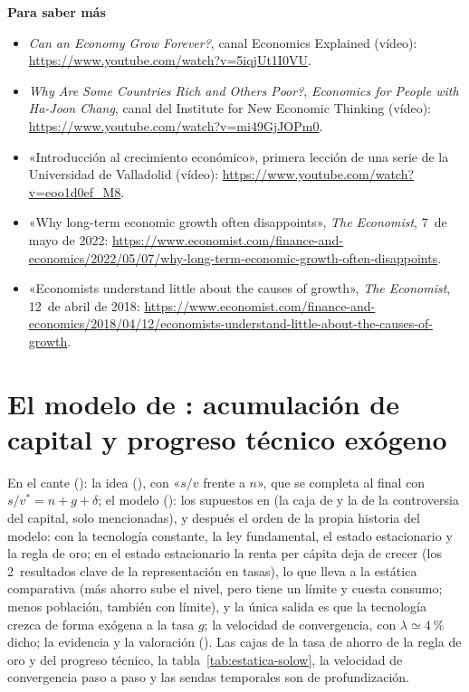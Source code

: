 \documentclass[11pt]{article}
\begin{document}
\begin{anotaciones}
\textbf{Para saber más}
\begin{itemize}
\item \emph{Can an Economy Grow Forever?}, canal Economics Explained (vídeo): \url{https://www.youtube.com/watch?v=5iqjUt1I0VU}\nocite{EconomicsExplained}.
\item \emph{Why Are Some Countries Rich and Others Poor?}, \emph{Economics for People with Ha-Joon Chang}, canal del Institute for New Economic Thinking (vídeo): \url{https://www.youtube.com/watch?v=mi49GjJOPm0}\nocite{INETChang}.
\item «Introducción al crecimiento económico», primera lección de una serie de la Universidad de Valladolid (vídeo): \url{https://www.youtube.com/watch?v=eoo1d0ef_M8}\nocite{UVaCrecimiento}.
\item «Why long-term economic growth often disappoints», \emph{The Economist}, 7~de mayo de 2022: \url{https://www.economist.com/finance-and-economics/2022/05/07/why-long-term-economic-growth-often-disappoints}\nocite{Economist2022Crecimiento}.
\item «Economists understand little about the causes of growth», \emph{The Economist}, 12~de abril de 2018: \url{https://www.economist.com/finance-and-economics/2018/04/12/economists-understand-little-about-the-causes-of-growth}\nocite{Economist2018Crecimiento}.
\end{itemize}
\end{anotaciones}

\section{El modelo de : acumulación de capital\cortetitulo{} y progreso técnico exógeno}\label{sec:solow}

\begin{notaopositor}
En el cante (): la idea (), con «$s/v$ frente a $n$», que se completa al final con $s/v^*=n+g+\delta$; el modelo (): los supuestos en  (la caja de  y la de la controversia del capital, solo mencionadas), y después el orden de la propia historia del modelo: con la tecnología constante, la ley fundamental, el estado estacionario y la regla de oro; en el estado estacionario la renta per cápita deja de crecer (los 2~resultados clave de la representación en tasas), lo que lleva a la estática comparativa (más ahorro sube el nivel, pero tiene un límite y cuesta consumo; menos población, también con límite), y la única salida es que la tecnología crezca de forma exógena a la tasa $g$; la velocidad de convergencia, con $\lambda\simeq4~\%$ dicho; la evidencia y la valoración (). Las cajas de la tasa de ahorro de la regla de oro y del progreso técnico, la tabla~\ref{tab:estatica-solow}, la velocidad de convergencia paso a paso y las sendas temporales son de profundización.
\end{notaopositor}
\end{document}
